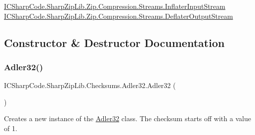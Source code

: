 \hyperlink{class_i_c_sharp_code_1_1_sharp_zip_lib_1_1_zip_1_1_compression_1_1_streams_1_1_inflater_input_stream}{I\+C\+Sharp\+Code.\+Sharp\+Zip\+Lib.\+Zip.\+Compression.\+Streams.\+Inflater\+Input\+Stream} \hyperlink{class_i_c_sharp_code_1_1_sharp_zip_lib_1_1_zip_1_1_compression_1_1_streams_1_1_deflater_output_stream}{I\+C\+Sharp\+Code.\+Sharp\+Zip\+Lib.\+Zip.\+Compression.\+Streams.\+Deflater\+Output\+Stream} 

\subsection{Constructor \& Destructor Documentation}
\mbox{\label{class_i_c_sharp_code_1_1_sharp_zip_lib_1_1_checksums_1_1_adler32_a972862f4f9c1bad593b4da0318299279}} 
\subsubsection{\texorpdfstring{Adler32()}{Adler32()}\hspace{0.1cm}{\footnotesize\ttfamily [1/2]}}
{\footnotesize\ttfamily I\+C\+Sharp\+Code.\+Sharp\+Zip\+Lib.\+Checksums.\+Adler32.\+Adler32 (\begin{DoxyParamCaption}{ }\end{DoxyParamCaption})\hspace{0.3cm}{\ttfamily [inline]}}



Creates a new instance of the \hyperlink{class_i_c_sharp_code_1_1_sharp_zip_lib_1_1_checksums_1_1_adler32}{Adler32} class. The checksum starts off with a value of 1. 

\mbox{\label{class_i_c_sharp_code_1_1_sharp_zip_lib_1_1_checksums_1_1_adler32_a972862f4f9c1bad593b4da0318299279}} 
